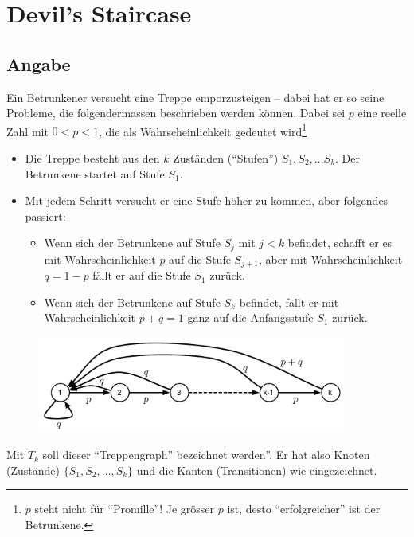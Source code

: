 \section*{Devil's Staircase}
\subsection*{Angabe}
Ein Betrunkener versucht eine Treppe emporzusteigen -- dabei hat er so seine
Probleme, die folgendermassen beschrieben werden können. Dabei sei $p$ eine
reelle Zahl mit $0<p<1$, die als Wahrscheinlichkeit gedeutet wird\footnote{ $p$
steht nicht für ``Promille''! Je grösser $p$ ist, desto ``erfolgreicher'' ist
der Betrunkene.}

\begin{itemize}
 \item Die Treppe besteht aus den $k$ Zuständen (``Stufen'') $S_1 ,S_2, \ldots
	 S_k$. Der Betrunkene startet auf Stufe $S_1$.
 \item Mit jedem Schritt versucht er eine Stufe höher zu kommen, aber folgendes
	 passiert:
       	\begin{itemize}
	\item Wenn sich der Betrunkene auf Stufe $S_j$ mit $j<k$ befindet,
		schafft er es mit Wahrscheinlichkeit $p$ auf die Stufe
		$S_{j+1}$, aber mit Wahrscheinlichkeit $q=1-p$ fällt er auf die
		Stufe $S_1$ zurück.
	\item Wenn sich der Betrunkene auf Stufe $S_k$  befindet, fällt er mit
		Wahrscheinlichkeit $p+q=1$ ganz auf die Anfangsstufe $S_1$
		zurück.
	\end{itemize}
\end{itemize}
\begin{figure}[htbp] %
   \centering
   \includegraphics[width=4in]{graphics/devilsgraph.pdf} 
\end{figure}
Mit $T_k$ soll dieser ``Treppengraph'' bezeichnet werden''. Er hat also Knoten
(Zustände) $\{S_1,S_2,\ldots,S_k\}$ und die Kanten (Transitionen) wie
eingezeichnet.

